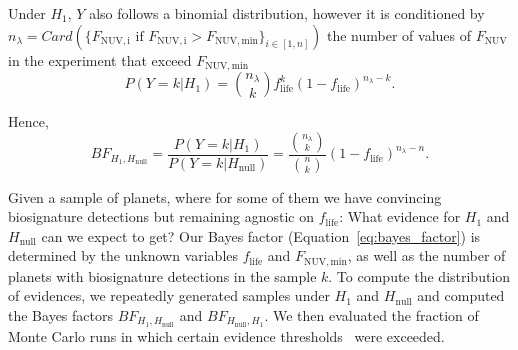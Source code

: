 \documentclass[twocolumn,twocolappendix,linenumbers]{aastex631}
\begin{document}
Under $H_1$, $Y$ also follows a binomial distribution, however it is conditioned by $n_{\lambda}=Card(\{F_\mathrm{NUV, i} \text{ if } F_\mathrm{NUV, i}>F_\mathrm{NUV, min}\}_{i \in [1,n]})$ the number of values of $F_\mathrm{NUV}$ in the experiment that exceed $F_\mathrm{NUV, min}$
\begin{equation}
\label{eq:semian:likelihoodH1}
P(Y=k|H_1) = \binom{n_{\lambda}}{k}f_\mathrm{life}^k(1-f_\mathrm{life})^{n_{\lambda}-k}.
\end{equation}

Hence,
\begin{equation}\label{eq:bayes_factor}
BF_{H_1,H_\mathrm{null}} = \frac{P(Y=k|H_1)}{P(Y=k|H_\mathrm{null})} = \frac{\binom{n_\lambda}{k}}{\binom{n}{k}}(1-f_\mathrm{life})^{n_{\lambda}-n}.
\end{equation}


Given a sample of planets, where for some of them we have convincing biosignature detections but remaining agnostic on $f_\mathrm{life}$: What evidence for $H_\mathrm{1}$ and $H_\mathrm{null}$ can we expect to get?
Our Bayes factor (Equation~\ref{eq:bayes_factor}) is determined by the unknown variables $f_\mathrm{life}$ and $F_\mathrm{NUV, min}$, as well as the number of planets with biosignature detections in the sample $k$.
To compute the distribution of evidences, we repeatedly generated samples under $H_\mathrm{1}$ and $H_\mathrm{null}$ and computed the Bayes factors $BF_{H_1,H_\mathrm{null}}$ and $BF_{H_\mathrm{null}, H_1}$.
We then evaluated the fraction of Monte Carlo runs in which certain evidence thresholds~\citep{Jeffreys1939} were exceeded.


\end{document}
